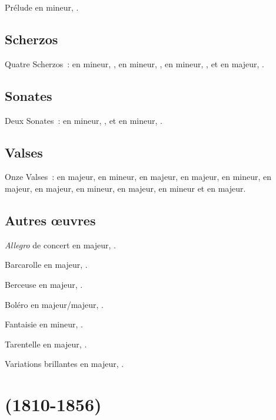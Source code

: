 Prélude en \kC \Sharp mineur, .

\subsection{Scherzos}

Quatre Scherzos~:  en \kB mineur, ,  en \kB
\Flat mineur, ,  en \kC \Sharp mineur, , et
 en \kE majeur, .

\subsection{Sonates}

Deux Sonates~:  en \kB \Flat mineur, , et  en
\kB mineur, .

\subsection{Valses}

Onze Valses~:   en \kA \Flat majeur,  
en \kA mineur,  en \kA \Flat majeur,   en \kD
\Flat majeur,   en \kC \Sharp mineur, 
 en \kA \Flat majeur,   en \kA \Flat majeur,
  en \kB mineur,   en \kG \Flat
majeur,   en \kF mineur et   en \kD
\Flat majeur.

\subsection{Autres œuvres}

\emph{Allegro} de concert en \kA majeur, .

Barcarolle en \kF \Sharp majeur, .

Berceuse en \kD \Flat majeur, .

Boléro en \kC majeur/\kA majeur, .

Fantaisie en \kF mineur, .

Tarentelle en \kA \Flat majeur, .

Variations brillantes en \kB \Flat majeur, .

\section[%
Robert Schumann (1810-1856)]{%
\RSchumann{} (1810-1856)}

